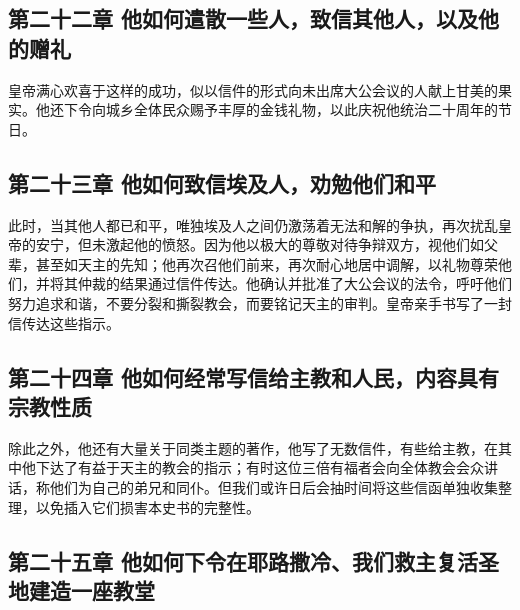 
\subsection{第二十二章 他如何遣散一些人，致信其他人，以及他的赠礼}

皇帝满心欢喜于这样的成功，似以信件的形式向未出席大公会议的人献上甘美的果实。他还下令向城乡全体民众赐予丰厚的金钱礼物，以此庆祝他统治二十周年的节日。\par


\subsection{第二十三章 他如何致信埃及人，劝勉他们和平}

此时，当其他人都已和平，唯独埃及人之间仍激荡着无法和解的争执，再次扰乱皇帝的安宁，但未激起他的愤怒。因为他以极大的尊敬对待争辩双方，视他们如父辈，甚至如天主的先知；他再次召他们前来，再次耐心地居中调解，以礼物尊荣他们，并将其仲裁的结果通过信件传达。他确认并批准了大公会议的法令，呼吁他们努力追求和谐，不要分裂和撕裂教会，而要铭记天主的审判。皇帝亲手书写了一封信传达这些指示。\par


\subsection{第二十四章 他如何经常写信给主教和人民，内容具有宗教性质}

除此之外，他还有大量关于同类主题的著作，他写了无数信件，有些给主教，在其中他下达了有益于天主的教会的指示；有时这位三倍有福者会向全体教会会众讲话，称他们为自己的弟兄和同仆。但我们或许日后会抽时间将这些信函单独收集整理，以免插入它们损害本史书的完整性。\par


\subsection{第二十五章 他如何下令在耶路撒冷、我们救主复活圣地建造一座教堂}

